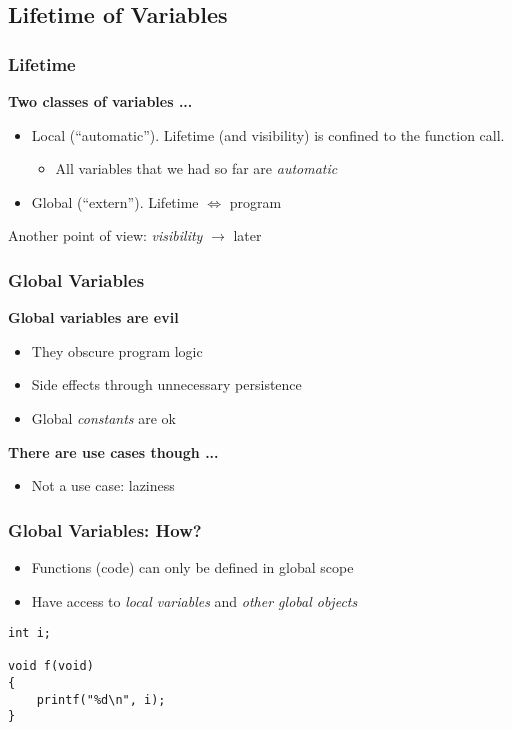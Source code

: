 \subsection{Lifetime of Variables}

\begin{frame}
  \frametitle{Lifetime}

  \textbf{Two classes of variables ...}

  \begin{itemize}
  \item Local (``automatic''). Lifetime (and visibility) is confined
    to the function call.
    \begin{itemize}
    \item All variables that we had so far are \textit{automatic}
    \end{itemize}
  \item Global (``extern''). Lifetime $\iff$ program
  \end{itemize}

  Another point of view: \textit{visibility} $\to$ later

\end{frame}

\begin{frame}
  \frametitle{Global Variables}

  \textbf{Global variables are evil}

  \begin{itemize}
  \item They obscure program logic
  \item Side effects through unnecessary persistence
  \item Global \textit{constants} are ok
  \end{itemize}

  \textbf{There are use cases though ...}

  \begin{itemize}
  \item Not a use case: \alert{laziness}
  \end{itemize}

\end{frame}

\begin{frame}[fragile]
  \frametitle{Global Variables: How?}

  \begin{itemize}
  \item Functions (code) can only be defined in global scope
  \item Have access to \textit{local variables} and \textit{other
    global objects}
  \end{itemize}

  \begin{block}{}
\begin{verbatim}
int i;

void f(void)
{
    printf("%d\n", i);
}
\end{verbatim}
  \end{block}

\end{frame}
